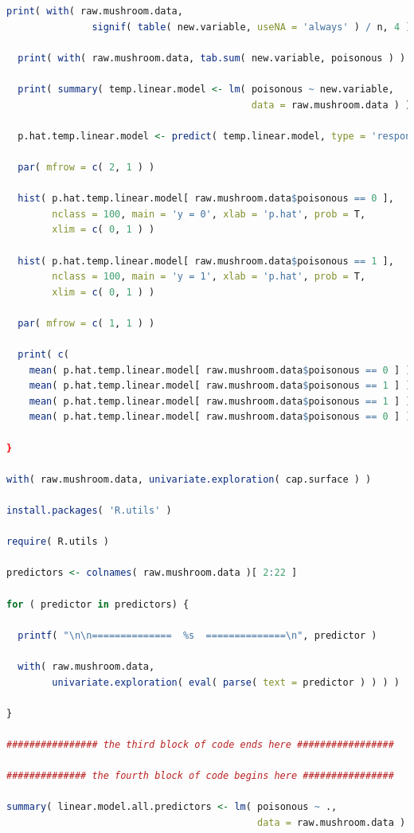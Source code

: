 \documentclass[12pt]{article}
\begin{document}
\begin{lstlisting}[language = R]
  print( with( raw.mushroom.data, 
               signif( table( new.variable, useNA = 'always' ) / n, 4 ) ) )
  
  print( with( raw.mushroom.data, tab.sum( new.variable, poisonous ) ) )
  
  print( summary( temp.linear.model <- lm( poisonous ~ new.variable, 
                                           data = raw.mushroom.data ) ) )
  
  p.hat.temp.linear.model <- predict( temp.linear.model, type = 'response' )
  
  par( mfrow = c( 2, 1 ) )
  
  hist( p.hat.temp.linear.model[ raw.mushroom.data$poisonous == 0 ],
        nclass = 100, main = 'y = 0', xlab = 'p.hat', prob = T,
        xlim = c( 0, 1 ) )
  
  hist( p.hat.temp.linear.model[ raw.mushroom.data$poisonous == 1 ],
        nclass = 100, main = 'y = 1', xlab = 'p.hat', prob = T,
        xlim = c( 0, 1 ) )
  
  par( mfrow = c( 1, 1 ) )
  
  print( c( 
    mean( p.hat.temp.linear.model[ raw.mushroom.data$poisonous == 0 ] ),
    mean( p.hat.temp.linear.model[ raw.mushroom.data$poisonous == 1 ] ),
    mean( p.hat.temp.linear.model[ raw.mushroom.data$poisonous == 1 ] ) -
    mean( p.hat.temp.linear.model[ raw.mushroom.data$poisonous == 0 ] ) ) )
  
}

with( raw.mushroom.data, univariate.exploration( cap.surface ) )

install.packages( 'R.utils' )

require( R.utils )

predictors <- colnames( raw.mushroom.data )[ 2:22 ]

for ( predictor in predictors) {
  
  printf( "\n\n==============  %s  ==============\n", predictor )
  
  with( raw.mushroom.data, 
        univariate.exploration( eval( parse( text = predictor ) ) ) )
  
}

################ the third block of code ends here #################

############## the fourth block of code begins here ################

summary( linear.model.all.predictors <- lm( poisonous ~ ., 
                                            data = raw.mushroom.data ) )


\end{lstlisting}
\end{document}
